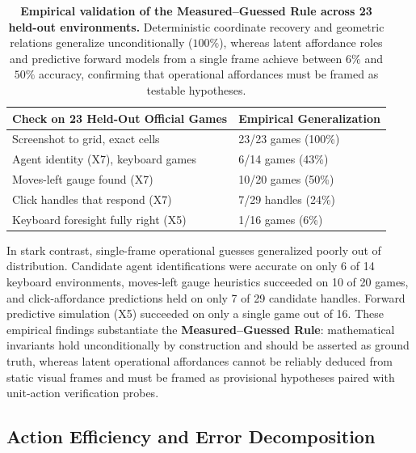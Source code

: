 \begin{table}[t]
\centering
\small
\begin{tabular}{@{}L{0.55\columnwidth}L{0.36\columnwidth}@{}}
\toprule
Check on 23 Held-Out Official Games & Empirical Generalization \\
\midrule
Screenshot to grid, exact cells & 23/23 games (100\%) \\
Agent identity (X7), keyboard games & 6/14 games (43\%) \\
Moves-left gauge found (X7) & 10/20 games (50\%) \\
Click handles that respond (X7) & 7/29 handles (24\%) \\
Keyboard foresight fully right (X5) & 1/16 games (6\%) \\
\bottomrule
\end{tabular}
\caption{\textbf{Empirical validation of the Measured--Guessed Rule across 23 held-out environments.} Deterministic coordinate recovery and geometric relations generalize unconditionally ($100\%$), whereas latent affordance roles and predictive forward models from a single frame achieve between $6\%$ and $50\%$ accuracy, confirming that operational affordances must be framed as testable hypotheses.}
\label{tab:holdout}
\end{table}

In stark contrast, single-frame operational guesses generalized poorly out of distribution. Candidate agent identifications were accurate on only 6 of 14 keyboard environments, moves-left gauge heuristics succeeded on 10 of 20 games, and click-affordance predictions held on only 7 of 29 candidate handles. Forward predictive simulation (X5) succeeded on only a single game out of 16. 
These empirical findings substantiate the \textbf{Measured--Guessed Rule}: mathematical invariants hold unconditionally by construction and should be asserted as ground truth, whereas latent operational affordances cannot be reliably deduced from static visual frames and must be framed as provisional hypotheses paired with unit-action verification probes.

\subsection{Action Efficiency and Error Decomposition}
\label{sec:efficiency}

